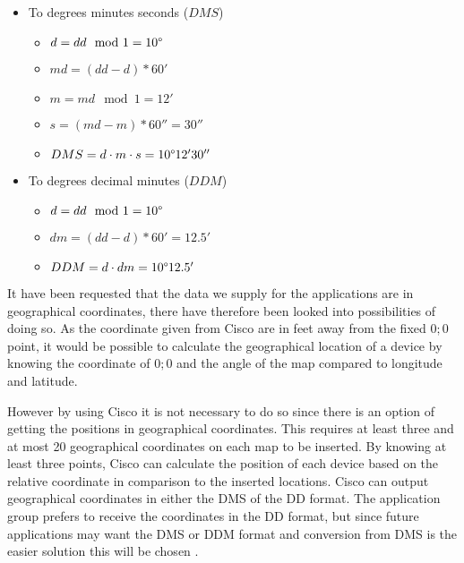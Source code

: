 \begin{itemize}
\begin{itemize}
		\item To degrees minutes seconds ($DMS$)
		\begin{itemize}
			\setlength\itemsep{0.00005em}
			\item $ d = dd \mod 1 = 10\degree $
			\item $ md = (dd - d) * 60' $
			\item $ m = md \mod 1 = 12' $
			\item $ s = (md - m) * 60'' = 30''$
			\item $ DMS = d \cdot m \cdot s = 10\degree 12' 30''$ 
		\end{itemize}
		\item To degrees decimal minutes ($DDM$)
		\begin{itemize}
			\setlength\itemsep{0.00005em}
			\item $ d = dd \mod 1 = 10\degree $
			\item $ dm = (dd - d) * 60' = 12.5' $
			\item $ DDM = d \cdot dm = 10\degree 12.5'$
		\end{itemize}
	\end{itemize}
\end{itemize}

It have been requested that the data we supply for the applications are in geographical coordinates, there have therefore been looked into possibilities of doing so.
As the coordinate given from Cisco are in feet away from the fixed ${0;0}$ point, it would be possible to calculate the geographical location of a device by knowing the coordinate of ${0;0}$ and the angle of the map compared to longitude and latitude. 

However by using Cisco it is not necessary to do so since there is an option of getting the positions in geographical coordinates. This requires at least three and at most 20 geographical coordinates on each map to be inserted. By knowing at least three points, Cisco can calculate the position of each device based on the relative coordinate in comparison to the inserted locations\cite{geo_cisco}. 
Cisco can output geographical coordinates in either the DMS of the DD format\cite{cisco_geo_type}. The application group prefers to receive the coordinates in the DD format, but since future applications may want the DMS or DDM format and conversion from DMS is the easier solution this will be chosen .

